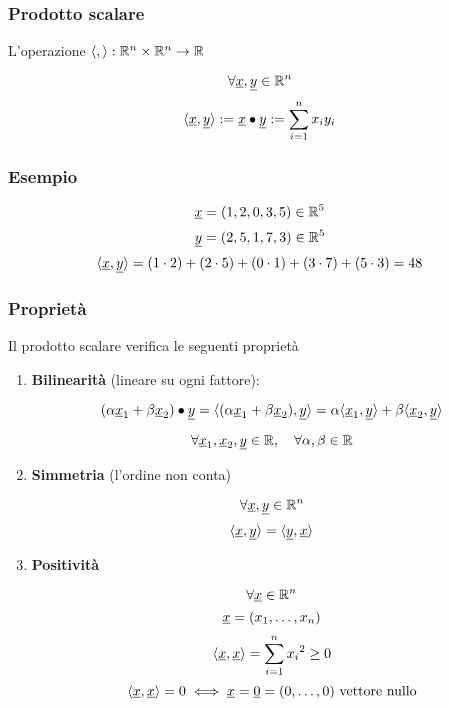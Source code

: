 \pagebreak{}

\subsubsection{Prodotto scalare}

L'operazione \(\langle,\rangle : \mathbb{R}^{n} \times \mathbb{R}^{n} \rightarrow \mathbb{R} \)

\[
    \forall \underline{x} ,\underline{y} \in \mathbb{R}^{n}
\]
\[
    \langle\underline{x},\underline{y}\rangle := \underline{x} \bullet \underline{y} := \sum^{n}_{i=1} x_i y_i
\]

\subsubsection*{Esempio}
\[
    \underline{x}=(1,2,0,3,5) \in \mathbb{R}^{5}
\]
\[
    \underline{y}=(2,5,1,7,3) \in \mathbb{R}^{5}
\]
\[
    \langle\underline{x},\underline{y}\rangle = (1\cdot2)+(2\cdot5)+(0\cdot1)+(3\cdot7)+(5\cdot3) = 48
\]

\subsubsection*{Proprietà}

Il prodotto scalare verifica le seguenti proprietà

\begin{enumerate}
    \item \textbf{Bilinearità} (lineare su ogni fattore):

          \[
              (\alpha \underline{x}_1 + \beta \underline{x}_2) \bullet \underline{y} = \langle(\alpha \underline{x}_1 + \beta \underline{x}_2),\underline{y}\rangle = \alpha \langle\underline{x}_1,\underline{y}\rangle + \beta \langle\underline{x}_2,\underline{y}\rangle
          \]

          \[
              \forall \underline{x}_1,\underline{x}_2,\underline{y} \in \mathbb{R}, \quad \forall \alpha, \beta \in \mathbb{R}
          \]

    \item \textbf{Simmetria} (l'ordine non conta)

          \[
              \forall \underline{x},\underline{y} \in \mathbb{R}^{n}
          \]
          \[
              \langle\underline{x},\underline{y}\rangle = \langle\underline{y},\underline{x}\rangle
          \]

    \item \textbf{Positività}

          \[
              \forall \underline{x} \in \mathbb{R}^{n}
          \]
          \[
              \underline{x}=(x_1, \ldots ,x_n)
          \]
          \[
              \langle\underline{x},\underline{x}\rangle = \sum^{n}_{i=1} {x_i}^{2}\ge 0
          \]
          \[
              \langle\underline{x},\underline{x}\rangle = 0 \iff \underline{x} = \underline{0} = (0, \ldots ,0)\ \text{vettore nullo}
          \]

\end{enumerate}

